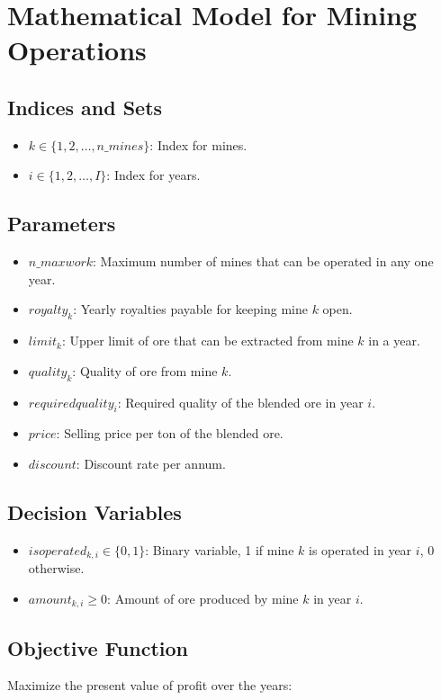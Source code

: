 \documentclass{article}
\begin{document}
\section*{Mathematical Model for Mining Operations}

\subsection*{Indices and Sets}
\begin{itemize}
    \item $k \in \{1, 2, \dots, n\_mines\}$: Index for mines.
    \item $i \in \{1, 2, \dots, I\}$: Index for years.
\end{itemize}

\subsection*{Parameters}
\begin{itemize}
    \item $n\_maxwork$: Maximum number of mines that can be operated in any one year.
    \item $royalty_k$: Yearly royalties payable for keeping mine $k$ open.
    \item $limit_k$: Upper limit of ore that can be extracted from mine $k$ in a year.
    \item $quality_k$: Quality of ore from mine $k$.
    \item $requiredquality_i$: Required quality of the blended ore in year $i$.
    \item $price$: Selling price per ton of the blended ore.
    \item $discount$: Discount rate per annum.
\end{itemize}

\subsection*{Decision Variables}
\begin{itemize}
    \item $isoperated_{k,i} \in \{0, 1\}$: Binary variable, 1 if mine $k$ is operated in year $i$, 0 otherwise.
    \item $amount_{k,i} \geq 0$: Amount of ore produced by mine $k$ in year $i$.
\end{itemize}

\subsection*{Objective Function}
Maximize the present value of profit over the years:
\end{document}
